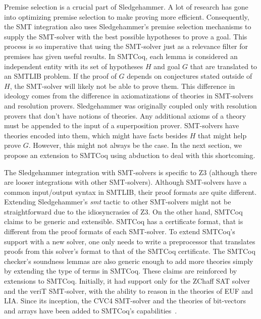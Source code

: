 \documentclass{article}
\begin{document}
	Premise selection is a crucial part of Sledgehammer. A lot 
	of research has gone into optimizing premise selection to 
	make proving more efficient. Consequently, the SMT 
	integration also uses Sledgehammer's premise selection 
	mechanisms to supply the SMT-solver with the best 
	possible hypotheses to prove a goal. This process is 
	so imperative that using the SMT-solver just as a 
	relevance filter for premises has given useful 
	results. In SMTCoq, each lemma is considered an 
	independent entity with its set of hypotheses $H$ and 
	goal $G$ that are translated to an SMTLIB problem. 
	If the proof of $G$ depends on conjectures stated
	outside of $H$, the SMT-solver will likely not be 
	able to prove them. This difference in 
	ideology comes from the difference in axiomatizations
	of theories in SMT-solvers and resolution provers. 
	Sledgehammer was originally coupled only 
	with resolution provers that don't have notions of 
	theories. Any additional axioms of a theory 
	must be appended to the input of a superposition 
	prover. SMT-solvers have theories encoded into them, 
	which might have facts besides $H$ that might help 
	prove $G$. However, this might not always be the case.
	In the next section, we propose an extension to SMTCoq 
	using abduction to deal with this shortcoming.
	
	The Sledgehammer integration with SMT-solvers is 
	specific to Z3 (although there are looser integrations 
	with other SMT-solvers). Although SMT-solvers have 
	a common input/output syntax in SMTLIB, their 
	proof formats are quite different. Extending 
	Sledgehammer's \textit{smt} tactic to other 
	SMT-solvers might not be straightforward due to 
	the idiosyncrasies of Z3. On the other hand, SMTCoq
	claims to be generic and extensible. SMTCoq has a 
	certificate format, that is different from the proof 
	formats of each SMT-solver. To extend SMTCoq's 
	support with a new solver, one only needs to 
	write a preprocessor that translates proofs from 
	this solver's format to that of the SMTCoq certificate.
	The SMTCoq checker's soundness lemmas are also generic 
	enough to add more theories simply by extending 
	the type of terms in SMTCoq. These claims are reinforced
	by extensions to SMTCoq. Initially, it had support only 
	for the ZChaff SAT solver and the veriT SMT-solver, 
	with the ability to reason in the theories of EUF and 
	LIA. Since its inception, the CVC4 SMT-solver and 
	the theories of bit-vectors and arrays have been 
	added to SMTCoq's
	capabilities~\cite{DBLP:journals/corr/EkiciKKMRT16}.
	
\end{document}
